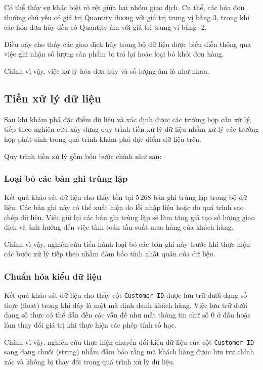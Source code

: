 \documentclass[12pt]{ai_conquer2026}
\begin{document}
Có thể thấy sự khác biệt rõ rệt giữa hai nhóm giao dịch. Cụ thể, các hóa đơn thường chủ yếu có giá trị Quantity dương với giá trị trung vị bằng 3, trong khi các hóa đơn hủy đều có Quantity âm với giá trị trung vị bằng -2. 

Điều này cho thấy các giao dịch hủy trong bộ dữ liệu được biểu diễn thông qua việc ghi nhận số lượng sản phẩm bị trả lại hoặc loại bỏ khỏi đơn hàng.

Chính vì vậy, việc xử lý hóa đơn hủy và số lượng âm là như nhau.

\subsection{Tiền xử lý dữ liệu}

Sau khi khám phá đặc điểm dữ liệu và xác định được các trường hợp cần xử lý, tiếp theo nghiên cứu xây dựng quy trình tiền xử lý dữ liệu nhằm xử lý các trường hợp phát sinh trong quá trình khám phá đặc điểm dữ liệu trên.

Quy trình tiền xử lý gồm bốn bước chính như sau:

\subsubsection{Loại bỏ các bản ghi trùng lặp}

Kết quả khảo sát dữ liệu cho thấy tồn tại 5\,268 bản ghi trùng lặp trong bộ dữ liệu. Các bản ghi này có thể xuất hiện do lỗi nhập liệu hoặc do quá trình sao chép dữ liệu. Việc giữ lại các bản ghi trùng lặp sẽ làm tăng giả tạo số lượng giao dịch và ảnh hưởng đến việc tính toán tần suất mua hàng của khách hàng.

Chính vì vậy, nghiên cứu tiến hành loại bỏ các bản ghi này trước khi thực hiện các bước xử lý tiếp theo nhằm đảm bảo tính nhất quán của dữ liệu.

\subsubsection{Chuẩn hóa kiểu dữ liệu}

Kết quả khảo sát dữ liệu cho thấy cột \texttt{Customer ID} được lưu trữ dưới dạng số thực (float) trong khi đây là một mã định danh khách hàng. Việc lưu trữ dưới dạng số thực có thể dẫn đến các vấn đề như mất thông tin chữ số 0 ở đầu hoặc làm thay đổi giá trị khi thực hiện các phép tính số học.

Chính vì vậy, nghiên cứu thực hiện chuyển đổi kiểu dữ liệu của cột \texttt{Customer ID} sang dạng chuỗi (string) nhằm đảm bảo rằng mã khách hàng được lưu trữ chính xác và không bị thay đổi trong quá trình xử lý dữ liệu.
\end{document}
